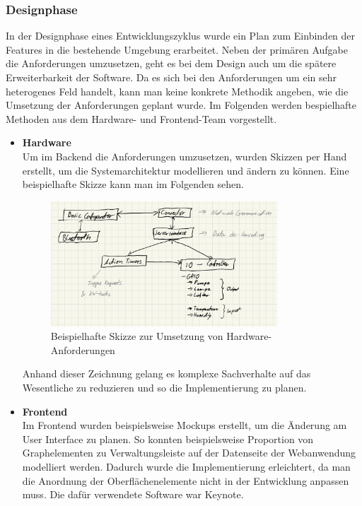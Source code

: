         \subsubsection*{Designphase}
        In der Designphase eines Entwicklungszyklus wurde ein Plan zum Einbinden der Features in die bestehende 
        Umgebung erarbeitet. Neben der primären Aufgabe die Anforderungen umzusetzen, geht es bei dem Design auch 
        um die spätere Erweiterbarkeit der Software. Da es sich bei den Anforderungen um ein sehr heterogenes 
        Feld handelt, kann man keine konkrete Methodik angeben, wie die Umsetzung der Anforderungen geplant
        wurde. Im Folgenden werden bespielhafte Methoden aus dem Hardware- und Frontend-Team vorgestellt. 
        \begin{itemize}
            \item \textbf{Hardware}\\
            Um im Backend die Anforderungen umzusetzen, wurden Skizzen per Hand erstellt, um die Systemarchitektur 
            modellieren und ändern zu können. Eine beispielhafte Skizze kann man im Folgenden sehen. 
            
            \begin{figure}[h]
                \centering
                \includegraphics[width=0.8\textwidth]{images/sketch_hardware}
                \caption{Beispielhafte Skizze zur Umsetzung von Hardware-Anforderungen}
                \label{fig:example}
            \end{figure}

            Anhand dieser Zeichnung gelang es komplexe Sachverhalte auf das Wesentliche zu reduzieren und so 
            die Implementierung zu planen. 
            
            
            \item \textbf{Frontend}\\
            Im Frontend wurden beispielsweise Mockups erstellt, um die Änderung am User Interface zu planen. 
            So konnten beispielsweise Proportion von Graphelementen zu Verwaltungsleiste auf der Datenseite der
            Webanwendung modelliert werden. Dadurch wurde die Implementierung erleichtert, da man die Anordnung 
            der Oberflächenelemente nicht in der Entwicklung anpassen muss. Die dafür verwendete Software war 
            Keynote. 
        \end{itemize}

